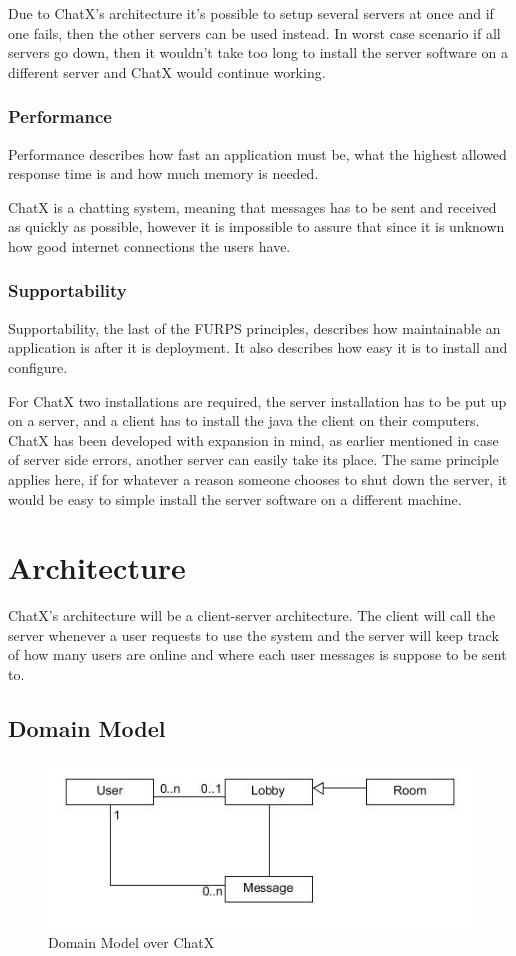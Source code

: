Due to ChatX's architecture it's possible to setup several servers at once and if one fails, then the other servers can be used instead. In worst case scenario if all servers go down, then it wouldn't take too long to install the server software on a different server and ChatX would continue working.

\subsubsection{Performance}Performance describes how fast an application must be, what the highest allowed response time is and how much memory is needed. 

ChatX is a chatting system, meaning that messages has to be sent and received as quickly as possible, however it is impossible to assure that since it is unknown how good internet connections the users have.

\subsubsection{Supportability}
Supportability, the last of the FURPS principles, describes how maintainable an application is after it is deployment. It also describes how easy it is to install and configure. 

For ChatX two installations are required, the server installation has to be put up on a server, and a client has to install the java the client on their computers. ChatX has been developed with expansion in mind, as earlier mentioned in case of server side errors, another server can easily take its place. The same principle applies here, if for whatever a reason someone chooses to shut down the server, it would be easy to simple install the server software on a different machine.

\section{Architecture}
ChatX's architecture will be a client-server architecture. The client will call the server whenever a user requests to use the system and the server will keep track of how many users are online and where each user messages is suppose to be sent to.

\subsection{Domain Model}

\begin{figure}[H]
\centering
\includegraphics[width=0.7\linewidth]{img/DomainModelChatX}
\caption{Domain Model over ChatX}
\label{fig:DomainModelChatX}
\end{figure}

